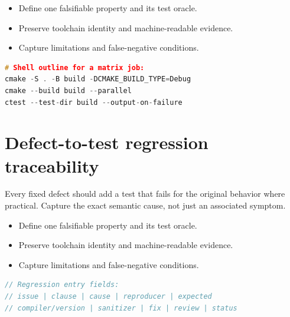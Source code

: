 \documentclass[11pt]{article}
\begin{document}
\begin{itemize}[leftmargin=*,itemsep=1pt,topsep=3pt]
\item Define one falsifiable property and its test oracle.
\item Preserve toolchain identity and machine-readable evidence.
\item Capture limitations and false-negative conditions.
\end{itemize}
\begin{lstlisting}[language=C++]
# Shell outline for a matrix job:
cmake -S . -B build -DCMAKE_BUILD_TYPE=Debug
cmake --build build --parallel
ctest --test-dir build --output-on-failure
\end{lstlisting}
\section{Defect-to-test regression traceability}
Every fixed defect should add a test that fails for the original behavior where practical. Capture the exact semantic cause, not just an associated symptom.

\begin{itemize}[leftmargin=*,itemsep=1pt,topsep=3pt]
\item Define one falsifiable property and its test oracle.
\item Preserve toolchain identity and machine-readable evidence.
\item Capture limitations and false-negative conditions.
\end{itemize}
\begin{lstlisting}[language=C++]
// Regression entry fields:
// issue | clause | cause | reproducer | expected
// compiler/version | sanitizer | fix | review | status
\end{lstlisting}
\end{document}
